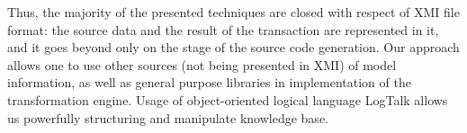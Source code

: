 \documentclass[conference]{IEEEtran}
\begin{document}


Thus, the majority of the presented techniques are closed with respect of XMI file format: the source data and the result of the transaction are represented in it, and it goes beyond only on the stage of the source code generation.  Our approach allows one to use other sources (not being presented in XMI) of model information, as well as general purpose libraries in implementation of the transformation engine.  Usage of object-oriented logical language LogTalk allows us powerfully structuring and manipulate knowledge base. %


\end{document}
